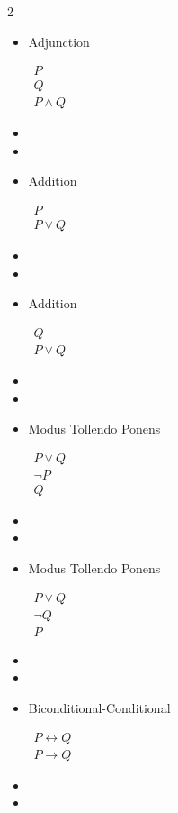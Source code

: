 \documentclass{article}
\begin{document}
\begin{multicols}{2}
\begin{itemize}
			\item Adjunction

			$\begin{array}{l}
				 P\\
				 Q\\\hline
				 P\wedge Q
			\end{array}$
			\item[]
			\item[]

			\item Addition

			$\begin{array}{l}
				 P\\\hline
				 P\vee Q
			\end{array}$
			\item[]
			\item[]

			\item Addition

			$\begin{array}{l}
				 Q\\\hline
				 P\vee Q
			\end{array}$
			\item[]
			\item[]

			\item Modus Tollendo Ponens

			$\begin{array}{l}
				 P\vee Q\\
				 \neg P\\\hline
				 Q
			\end{array}$
			\item[]
			\item[]

			\item Modus Tollendo Ponens

			$\begin{array}{l}
				 P\vee Q\\
				 \neg Q\\\hline
				 P
			\end{array}$

			\item[]
			\item[]

			\item Biconditional-Conditional

			$\begin{array}{l}
				 P\leftrightarrow Q\\\hline
				 P\rightarrow Q
			\end{array}$
			\item[]
			\item[]


\end{itemize}
\end{multicols}
\end{document}
